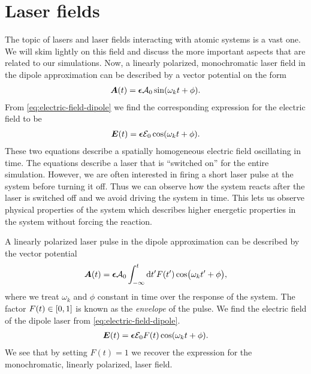     \section{Laser fields}
        The topic of lasers and laser fields interacting with atomic systems is
        a vast one.
        We will skim lightly on this field and discuss the more important
        aspects that are related to our simulations.
        Now, a linearly polarized, monochromatic laser field in the dipole
        approximation can be described by a vector potential on the form
        \cite{joachain2012atoms}
        \begin{align}
            \boldsymbol{A}(t) = \boldsymbol{\epsilon}\mathcal{A}_0
            \sin(\omega_k t + \phi). \\
        \end{align}
        From \autoref{eq:electric-field-dipole} we find the corresponding
        expression for the electric field to be
        \begin{align}
            \boldsymbol{E}(t) = \boldsymbol{\epsilon} \mathcal{E}_0
            \cos(\omega_k t + \phi).
        \end{align}
        These two equations describe a spatially homogeneous electric field
        oscillating in time.
        The equations describe a laser that is ``switched on'' for the entire
        simulation.
        However, we are often interested in firing a short laser pulse at the
        system before turning it off.
        Thus we can observe how the system reacts after the laser is switched
        off and we avoid driving the system in time.
        This lets us observe physical properties of the system which describes
        higher energetic properties in the system without forcing the reaction.

        A linearly polarized laser pulse in the dipole approximation can be
        described by the vector potential \cite{joachain2012atoms}
        \begin{align}
            \boldsymbol{A}(t)
            = \boldsymbol{\epsilon} \mathcal{A}_0
            \int_{-\infty}^{t}
            \dd t'
            F(t')
            \cos(\omega_k t' + \phi),
        \end{align}
        where we treat $\omega_k$ and $\phi$ constant in time over the response
        of the system.
        The factor $F(t) \in \left[ 0, 1 \right]$ is known as the \emph{envelope} of the
        pulse.
        We find the electric field of the dipole laser from
        \autoref{eq:electric-field-dipole}.
        \begin{align}
            \boldsymbol{E}(t)
            = \boldsymbol{\epsilon} \mathcal{E}_0 F(t) \cos(\omega_k t + \phi).
        \end{align}
        We see that by setting $F(t) = 1$ we recover the expression for the
        monochromatic, linearly polarized, laser field.

